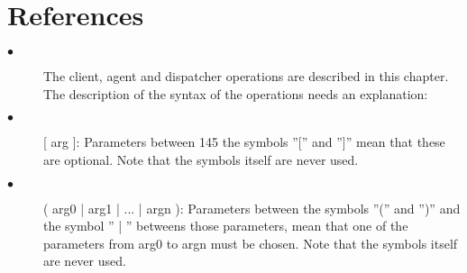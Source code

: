 \documentclass[a4paper]{article}
\begin{document}
\section{References}
\begin{description}
\item[$\bullet$] The client, agent and dispatcher operations are described in this chapter. The description of
the syntax of the operations needs an explanation:
\item[$\bullet$]  [ arg ]: Parameters between 145 the symbols ”[” and ”]” mean that these are optional. Note
that the symbols itself are never used.
\item[$\bullet$] ( arg0 | arg1 | ... | argn ): Parameters between the symbols ”(” and ”)” and the symbol
” | ” betweens those parameters, mean that one of the parameters from arg0 to argn
must be chosen. Note that the symbols itself are never used.
\end{description}
\end{document}

